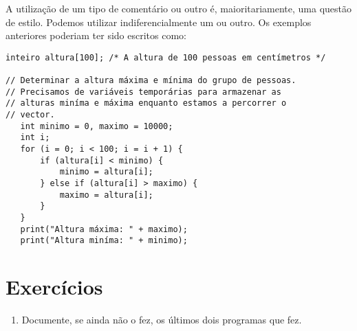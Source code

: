 A utilização de um tipo de comentário ou outro é, maioritariamente, uma questão de estilo. 
Podemos utilizar indiferencialmente um ou outro. Os exemplos anteriores poderiam ter sido escritos como:
\begin{lstlisting}
inteiro altura[100]; /* A altura de 100 pessoas em centímetros */

// Determinar a altura máxima e mínima do grupo de pessoas.
// Precisamos de variáveis temporárias para armazenar as 
// alturas miníma e máxima enquanto estamos a percorrer o 
// vector.
   int minimo = 0, maximo = 10000;
   int i;
   for (i = 0; i < 100; i = i + 1) {
       if (altura[i] < minimo) {           
           minimo = altura[i];
       } else if (altura[i] > maximo) {
           maximo = altura[i];
       }
   }
   print("Altura máxima: " + maximo);
   print("Altura miníma: " + minimo);
\end{lstlisting}


\section{Exercícios}
\begin{enumerate}
\item 
Documente, se ainda não o fez, os últimos dois programas que fez.	
\end{enumerate}